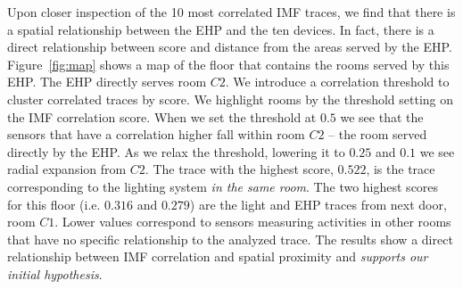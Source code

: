 Upon closer inspection of the 10 most correlated IMF traces, we find that there is a spatial relationship
between the EHP and the ten devices.  In fact, there is a direct relationship between score and distance from
the areas served by the EHP.  Figure~\ref{fig:map} shows a map of the floor that contains the rooms served by this
EHP.  The EHP directly serves room $C2$.  We introduce a correlation threshold to cluster correlated traces by score.
We highlight rooms by the threshold setting on the IMF correlation score.
When we set the threshold at $0.5$ we see that the sensors that have a correlation higher fall within room $C2$ --
the room served directly by the EHP.  As we relax the threshold, lowering it to $0.25$ and $0.1$ we see radial expansion from $C2$.  The trace with the highest score, $0.522$, is the trace corresponding to the lighting system \emph{in
the same room}.
The two highest scores for this floor (i.e. $0.316$ and $0.279$) are the light and EHP traces from next door, room $C1$.
Lower values correspond to sensors measuring activities in other rooms that have no specific relationship to the analyzed trace.  The results show a direct relationship between IMF correlation and spatial proximity and \emph{supports our initial
hypothesis}.




